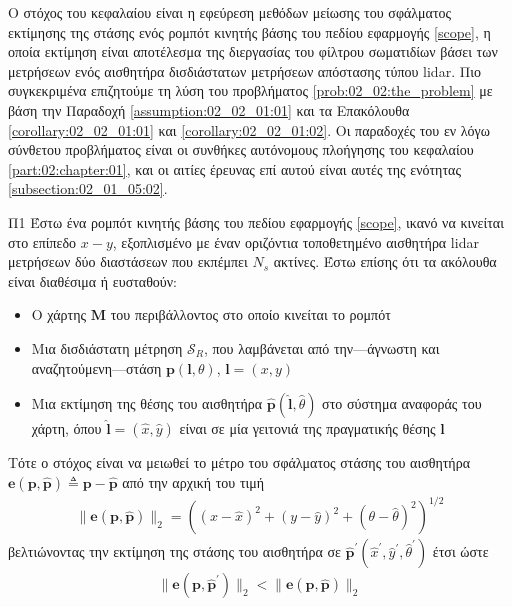 Ο στόχος του κεφαλαίου είναι η εφεύρεση μεθόδων μείωσης του σφάλματος εκτίμησης
της στάσης ενός ρομπότ κινητής βάσης του πεδίου εφαρμογής \ref{scope}, η οποία
εκτίμηση είναι αποτέλεσμα της διεργασίας του φίλτρου σωματιδίων βάσει των
μετρήσεων ενός αισθητήρα δισδιάστατων μετρήσεων απόστασης τύπου lidar. Πιο
συγκεκριμένα επιζητούμε τη λύση του προβλήματος \ref{prob:02_02:the_problem}
με βάση την Παραδοχή \ref{assumption:02_02_01:01} και τα Επακόλουθα
\ref{corollary:02_02_01:01} και \ref{corollary:02_02_01:02}. Οι παραδοχές
του εν λόγω σύνθετου προβλήματος είναι οι συνθήκες αυτόνομους πλοήγησης
του κεφαλαίου \ref{part:02:chapter:01}, και οι αιτίες έρευνας επί αυτού
είναι αυτές της ενότητας \ref{subsection:02_01_05:02}.

\begin{bw_box}
\begin{customproblem}{Π1}
  \label{prob:02_02:the_problem}
  Έστω ένα ρομπότ κινητής βάσης του πεδίου εφαρμογής \ref{scope}, ικανό να
  κινείται στο επίπεδο $x-y$, εξοπλισμένο με έναν οριζόντια τοποθετημένο
  αισθητήρα lidar μετρήσεων δύο διαστάσεων που εκπέμπει $N_s$ ακτίνες. Έστω
  επίσης ότι τα ακόλουθα είναι διαθέσιμα ή ευσταθούν:
  \begin{itemize}
    \item Ο χάρτης $\bm{M}$ του περιβάλλοντος στο οποίο κινείται το ρομπότ
    \item Μια δισδιάστατη μέτρηση $\mathcal{S}_R$, που λαμβάνεται από
          την---άγνωστη και αναζητούμενη---στάση $\bm{p}(\bm{l},\theta)$,
          $\bm{l} = (x,y)$
    \item Μια εκτίμηση της θέσης του αισθητήρα
          $\hat{\bm{p}}(\hat{\bm{l}}, \hat{\theta})$ στο σύστημα αναφοράς του
          χάρτη, όπου $\hat{\bm{l}} = (\hat{x}, \hat{y})$ είναι σε μία γειτονιά
          της πραγματικής θέσης $\bm{l}$
  \end{itemize}
\end{customproblem}
Τότε ο στόχος είναι να μειωθεί το μέτρο του σφάλματος στάσης του αισθητήρα
$\bm{e}(\bm{p}, \hat{\bm{p}}) \triangleq \bm{p}- \hat{\bm{p}}$ από την αρχική
του τιμή
\begin{align}
  \|\bm{e}(\bm{p}, \hat{\bm{p}})\|_2 = ((x- \hat{x})^2 + (y- \hat{y})^2 + (\theta- \hat{\theta})^2)^{1/2}
  \label{eq:pose_error_def}
\end{align}
βελτιώνοντας την εκτίμηση της στάσης του αισθητήρα σε
$\hat{\bm{p}}^\prime(\hat{x}^\prime, \hat{y}^\prime, \hat{\theta}^\prime)$ έτσι ώστε
\begin{align}
  \|\bm{e}(\bm{p}, \hat{\bm{p}}^\prime)\|_2 < \|\bm{e}(\bm{p}, \hat{\bm{p}})\|_2
  \tag{$\ast$}
  \label{obj:the_objective}
\end{align}
\end{bw_box}

